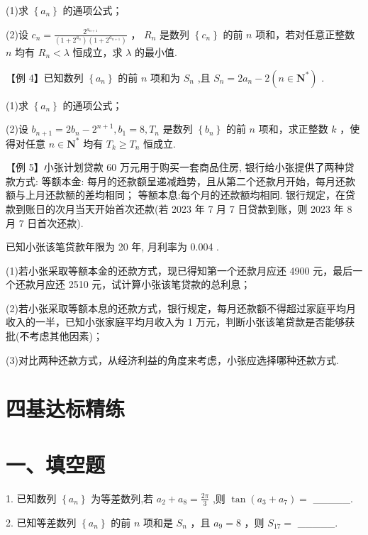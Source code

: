(1)求 $\left\{  {a}_{n}\right\}$ 的通项公式；

(2)设 ${c}_{n} = \frac{{2}^{{a}_{n + 1}}}{\left( {1 + {2}^{{a}_{n}}}\right) \left( {1 + {2}^{{a}_{n + 1}}}\right) }$ ， ${R}_{n}$ 是数列 $\left\{  {c}_{n}\right\}$ 的前 $n$ 项和，若对任意正整数 $n$ 均有 ${R}_{n} < \lambda$ 恒成立，求 $\lambda$ 的最小值.

【例 4】已知数列 $\left\{  {a}_{n}\right\}$ 的前 $n$ 项和为 ${S}_{n}$ ,且 ${S}_{n} = 2{a}_{n} - 2\left( {n \in  {\mathbf{N}}^{ * }}\right)$ .

(1)求 $\left\{  {a}_{n}\right\}$ 的通项公式；

(2)设 ${b}_{n + 1} = 2{b}_{n} - {2}^{n + 1},{b}_{1} = 8,{T}_{n}$ 是数列 $\left\{  {b}_{n}\right\}$ 的前 $n$ 项和，求正整数 $k$ ，使得对任意 $n \in  {\mathbf{N}}^{ * }$ 均有 ${T}_{k} \geq  {T}_{n}$ 恒成立.

【例 5】小张计划贷款 60 万元用于购买一套商品住房, 银行给小张提供了两种贷款方式:    等额本金: 每月的还款额呈递减趋势，且从第二个还款月开始，每月还款额与上月还款额的差均相同；   等额本息:每个月的还款额均相同. 银行规定，在贷款到账日的次月当天开始首次还款(若 2023 年 7 月 7 日贷款到账，则 2023 年 8 月 7 日首次还款).

已知小张该笔贷款年限为 20 年, 月利率为 0.004 .

(1)若小张采取等额本金的还款方式，现已得知第一个还款月应还 4900 元，最后一个还款月应还 2510 元，试计算小张该笔贷款的总利息；

(2)若小张采取等额本息的还款方式，银行规定，每月还款额不得超过家庭平均月收入的一半，已知小张家庭平均月收入为 1 万元，判断小张该笔贷款是否能够获批(不考虑其他因素)；

(3)对比两种还款方式，从经济利益的角度来考虑，小张应选择哪种还款方式.

\section*{四基达标精练}

\section*{一、填空题}

1. 已知数列 $\left\{  {a}_{n}\right\}$ 为等差数列,若 ${a}_{2} + {a}_{8} = \frac{2\pi }{3}$ ,则 $\tan \left( {{a}_{3} + {a}_{7}}\right)  =$ \_\_\_\_\_.

2. 已知等差数列 $\left\{  {a}_{n}\right\}$ 的前 $n$ 项和是 ${S}_{n}$ ，且 ${a}_{9} = 8$ ，则 ${S}_{17} =$ \_\_\_\_\_.

